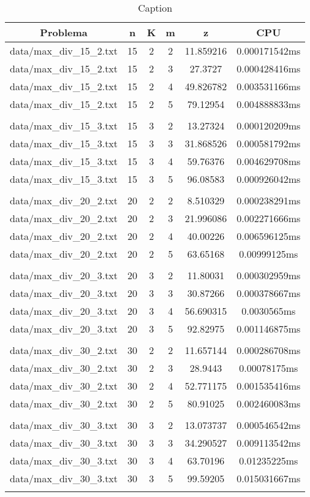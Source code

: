\begin{table}[h]
\centering
\begin{tabular}{|c|c|c|c|c|c|}
\hline
Problema &  n &  K &  m &  z &  CPU \\
\hline
data/max\_div\_15\_2.txt &  15 &  2 &  2 &  11.859216 &  0.000171542ms \\
data/max\_div\_15\_2.txt &  15 &  2 &  3 &  27.3727 &  0.000428416ms \\
data/max\_div\_15\_2.txt &  15 &  2 &  4 &  49.826782 &  0.003531166ms \\
data/max\_div\_15\_2.txt &  15 &  2 &  5 &  79.12954 &  0.004888833ms \\
 \\
data/max\_div\_15\_3.txt &  15 &  3 &  2 &  13.27324 &  0.000120209ms \\
data/max\_div\_15\_3.txt &  15 &  3 &  3 &  31.868526 &  0.000581792ms \\
data/max\_div\_15\_3.txt &  15 &  3 &  4 &  59.76376 &  0.004629708ms \\
data/max\_div\_15\_3.txt &  15 &  3 &  5 &  96.08583 &  0.000926042ms \\
 \\
data/max\_div\_20\_2.txt &  20 &  2 &  2 &  8.510329 &  0.000238291ms \\
data/max\_div\_20\_2.txt &  20 &  2 &  3 &  21.996086 &  0.002271666ms \\
data/max\_div\_20\_2.txt &  20 &  2 &  4 &  40.00226 &  0.006596125ms \\
data/max\_div\_20\_2.txt &  20 &  2 &  5 &  63.65168 &  0.00999125ms \\
 \\
data/max\_div\_20\_3.txt &  20 &  3 &  2 &  11.80031 &  0.000302959ms \\
data/max\_div\_20\_3.txt &  20 &  3 &  3 &  30.87266 &  0.000378667ms \\
data/max\_div\_20\_3.txt &  20 &  3 &  4 &  56.690315 &  0.0030565ms \\
data/max\_div\_20\_3.txt &  20 &  3 &  5 &  92.82975 &  0.001146875ms \\
 \\
data/max\_div\_30\_2.txt &  30 &  2 &  2 &  11.657144 &  0.000286708ms \\
data/max\_div\_30\_2.txt &  30 &  2 &  3 &  28.9443 &  0.00078175ms \\
data/max\_div\_30\_2.txt &  30 &  2 &  4 &  52.771175 &  0.001535416ms \\
data/max\_div\_30\_2.txt &  30 &  2 &  5 &  80.91025 &  0.002460083ms \\
 \\
data/max\_div\_30\_3.txt &  30 &  3 &  2 &  13.073737 &  0.000546542ms \\
data/max\_div\_30\_3.txt &  30 &  3 &  3 &  34.290527 &  0.009113542ms \\
data/max\_div\_30\_3.txt &  30 &  3 &  4 &  63.70196 &  0.01235225ms \\
data/max\_div\_30\_3.txt &  30 &  3 &  5 &  99.59205 &  0.015031667ms \\
 \\
\hline
\end{tabular}
\caption{Caption}
\label{tab:my_table}
\end{table}